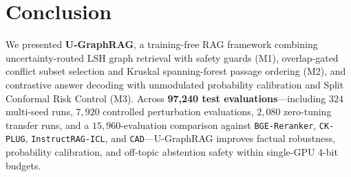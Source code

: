 \documentclass[11pt]{article}
\begin{document}
\section{Conclusion}

We presented \textbf{U-GraphRAG}, a training-free RAG framework combining uncertainty-routed LSH graph retrieval with safety guards (M1), overlap-gated conflict subset selection and Kruskal spanning-forest passage ordering (M2), and contrastive answer decoding with unmodulated probability calibration and Split Conformal Risk Control (M3). Across \textbf{97,240 test evaluations}---including $324$ multi-seed runs, $7,920$ controlled perturbation evaluations, $2,080$ zero-tuning transfer runs, and a $15,960$-evaluation comparison against \texttt{BGE-Reranker}, \texttt{CK-PLUG}, \texttt{InstructRAG-ICL}, and \texttt{CAD}---U-GraphRAG improves factual robustness, probability calibration, and off-topic abstention safety within single-GPU 4-bit budgets.


\end{document}
